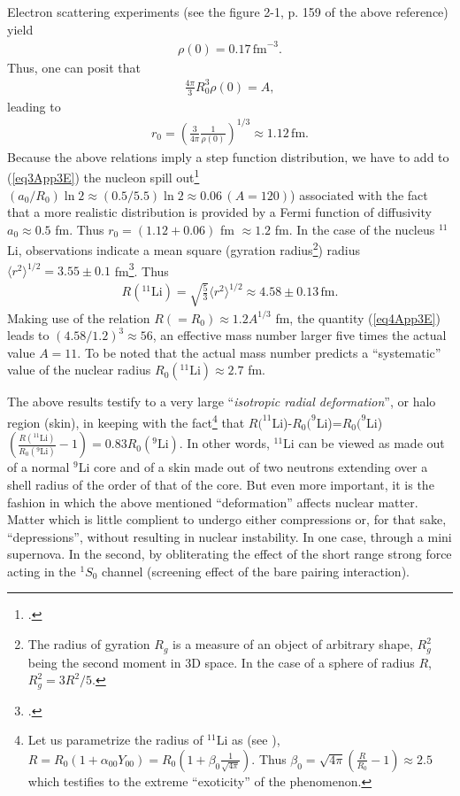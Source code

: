 Electron scattering experiments (see the figure 2-1, p. 159 of the above reference) yield
\begin{align}
\rho(0)=0.17\,\text{fm}^{-3}.
\end{align}
Thus, one can posit that
\begin{align}
\frac{4\pi}{3}R_0^3\rho(0)=A,
\end{align}
leading to
\begin{align}\label{eq3App3E}
r_0=\left(\frac{3}{4\pi}\frac{1}{\rho(0)}\right)^{1/3}\approx 1.12\,\text{fm}.
\end{align}
Because the above relations imply a step function distribution, we have to add to (\ref{eq3App3E}) the nucleon spill out\footnote{\cite{Bertsch:05}.} $(a_0/R_0)\ln 2\approx (0.5/5.5)\ln 2\approx 0.06\, (A=120)$) associated with the fact that a more realistic distribution is provided by a Fermi function of diffusivity $a_0\approx 0.5$ fm. Thus $r_0=(1.12+0.06)$ fm $\approx 1.2$ fm. In the case of the nucleus $^{11}$Li, observations indicate a mean square (gyration radius\footnote{The radius of gyration $R_g$ is a measure of an object of arbitrary shape, $R^2_g$ being the second moment in 3D space. In the case of a sphere of radius $R$, $R^2_g=3R^2/5$.}) radius $\langle r^2\rangle^{1/2}=3.55\pm 0.1$ fm\footnote{\cite{Kobayashi:89}.}. Thus
\begin{align}\label{eq4App3E}
R(^{11}\text{Li})=\sqrt{\frac{5}{3}}\langle r^2\rangle^{1/2}\approx 4.58\pm 0.13\,\text{fm}.
\end{align}
Making use of the relation $R(=R_0)\approx1.2 A^{1/3}$ fm, the quantity (\ref{eq4App3E}) leads to $(4.58/1.2)^3\approx56$, an effective mass number larger five times the actual value $A=11$. To be noted that the actual mass number predicts a ``systematic'' value of the nuclear radius $R_0(^{11}\text{Li})\approx 2.7$ fm.


The above results testify to a very large ``\emph{isotropic radial deformation}'', or halo region (skin), in keeping with the fact\footnote{Let us  parametrize the radius of $^{11}$Li as (see \cite{Bohr:75}), $R=R_0(1+\alpha_{00}Y_{00})=R_0(1+\beta_{0}\frac{1}{\sqrt{4\pi}})$. Thus $\beta_0=\sqrt{4\pi}(\frac{R}{R_0}-1)\approx 2.5$ which testifies to the extreme ``exoticity'' of the phenomenon.} that $R(^{11}$Li)-$R_0(^{9}$Li)=$R_0(^{9}$Li)$(\frac{R(^{11}\text{Li})}{R_0(^9\text{Li})}-1)=0.83R_0(^9\text{Li})$. In other words, $^{11}$Li can be viewed as made out of a normal $^{9}$Li core and of a skin made out of two neutrons   extending over a shell radius of the order of that of the core. But even more important, it is the fashion in which the above mentioned ``deformation'' affects nuclear matter. Matter  which is little complient to undergo either compressions or, for that sake, ``depressions'', without resulting in nuclear instability. In one case, through a mini supernova. In the second, by obliterating the effect of the short range strong force acting in the $^1S_0$ channel (screening effect of the bare pairing interaction).


